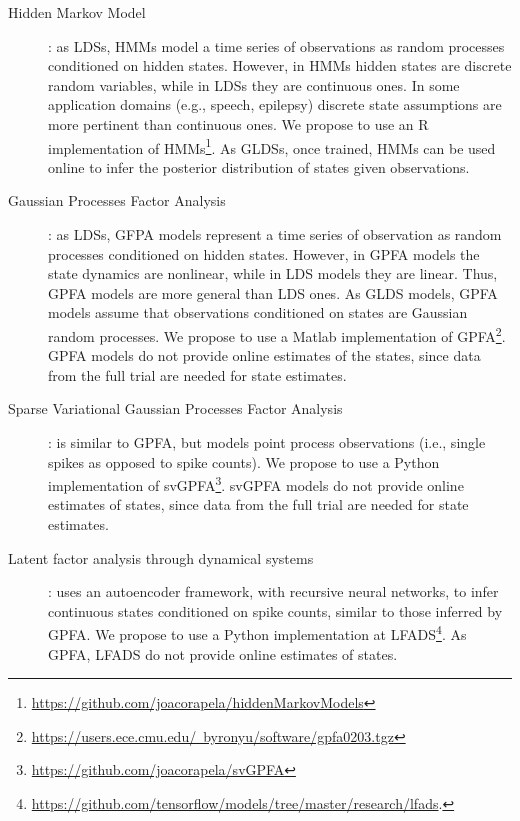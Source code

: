 \begin{description}
    \item[Hidden Markov Model]\citep[HMM;][]{rabiner89}: as LDSs, HMMs model a
        time series of observations as random processes conditioned on hidden
        states. However, in HMMs hidden states are discrete random variables,
        while in LDSs they are continuous ones. In some application domains
        (e.g., speech, epilepsy) discrete state assumptions are more pertinent
        than continuous ones. We propose to use an R implementation of
        HMMs\footnote{\href{https://github.com/joacorapela/hiddenMarkovModels}{https://github.com/joacorapela/hiddenMarkovModels}}.
        As GLDSs, once trained, HMMs can be used online to infer the posterior
        distribution of states given observations.

    \item[Gaussian Processes Factor Analysis]\citep[GPFA;][]{yuEtAl09}: as
        LDSs, GFPA models represent a time series of observation as random
        processes conditioned on hidden states. However, in GPFA models the
        state dynamics are nonlinear, while in LDS models they are linear.
        Thus, GPFA models are more general than LDS ones. As GLDS models, GPFA
        models assume that observations conditioned on states are Gaussian
        random processes. We propose to use a Matlab implementation of
        GPFA\footnote{\href{https://users.ece.cmu.edu/~byronyu/software/gpfa0203.tgz}{https://users.ece.cmu.edu/~byronyu/software/gpfa0203.tgz}}.
        GPFA models do not provide online estimates of the states, since data
        from the full trial are needed for state estimates.

    \item[Sparse Variational Gaussian Processes Factor
        Analysis]\citep[svGPFA;][]{dunckerAndSahani18}: is similar to GPFA, but
        models point process observations (i.e., single spikes as opposed to
        spike counts). We propose to use a Python implementation of
        svGPFA\footnote{\href{https://github.com/joacorapela/svGPFA}{https://github.com/joacorapela/svGPFA}}.
        svGPFA models do not provide online estimates of states, since data
        from the full trial are needed for state estimates.

    \item[Latent factor analysis through dynamical
        systems]\citep[LFADS;][]{pandarinathEtAl18}: uses an autoencoder
        framework, with recursive neural networks, to infer continuous states
        conditioned on spike counts, similar to those inferred by GPFA. We
        propose to use a Python implementation at
        LFADS\footnote{\href{https://github.com/tensorflow/models/tree/master/research/lfads}{https://github.com/tensorflow/models/tree/master/research/lfads}.}.
        As GPFA, LFADS do not provide online estimates of states.

\end{description}

